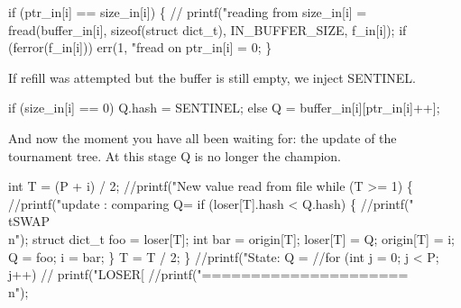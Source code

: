 \documentclass{article}%
\begin{document}
\nwenddocs{}\endmoddef\nwstartdeflinemarkup{}\nwenddeflinemarkup
if (ptr_in[i] == size_in[i]) \{
        // printf("reading from %
        size_in[i] = fread(buffer_in[i], sizeof(struct dict_t), IN_BUFFER_SIZE, f_in[i]);
        if (ferror(f_in[i]))
                err(1, "fread on %
        ptr_in[i] = 0;
\}

\nwendcode{}If refill was attempted but the buffer is still empty, we inject {\Tt{}SENTINEL\nwendquote}.

\nwenddocs{}\endmoddef\nwstartdeflinemarkup{}\nwenddeflinemarkup
if (size_in[i] == 0)
        Q.hash = SENTINEL;
else
        Q = buffer_in[i][ptr_in[i]++];

\nwendcode{}And now the moment you have all been waiting for: the update of the
tournament tree. At this stage {\Tt{}Q\nwendquote} is no longer the champion.

\nwenddocs{}\endmoddef\nwstartdeflinemarkup{}\nwenddeflinemarkup
int T = (P + i) / 2;
//printf("New value read from file %
while (T >= 1) \{
        //printf("update : comparing Q=%
        if (loser[T].hash < Q.hash) \{
                //printf("\\tSWAP\\n");
                struct dict_t foo = loser[T];
                int bar = origin[T];
                loser[T] = Q;
                origin[T] = i;
                Q = foo;
                i = bar;
        \}
        T = T / 2;
\}
//printf("State: Q = %
//for (int j = 0; j < P; j++)
//      printf("LOSER[%
//printf("=====================\\n");
\end{document}
